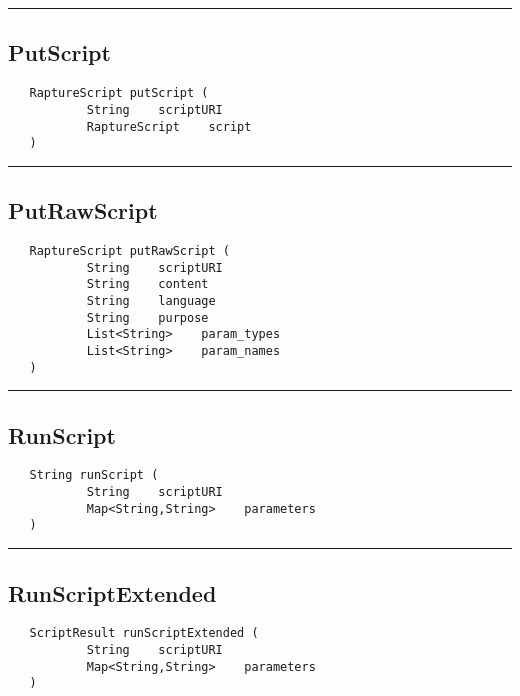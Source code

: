 \rule{15cm}{2pt}
\subsection{PutScript}
\label{Api:PutScript}
\begin{verbatim}
   RaptureScript putScript (
           String    scriptURI
           RaptureScript    script
   )
\end{verbatim}



\rule{15cm}{2pt}
\subsection{PutRawScript}
\label{Api:PutRawScript}
\begin{verbatim}
   RaptureScript putRawScript (
           String    scriptURI
           String    content
           String    language
           String    purpose
           List<String>    param_types
           List<String>    param_names
   )
\end{verbatim}



\rule{15cm}{2pt}
\subsection{RunScript}
\label{Api:RunScript}
\begin{verbatim}
   String runScript (
           String    scriptURI
           Map<String,String>    parameters
   )
\end{verbatim}



\rule{15cm}{2pt}
\subsection{RunScriptExtended}
\label{Api:RunScriptExtended}
\begin{verbatim}
   ScriptResult runScriptExtended (
           String    scriptURI
           Map<String,String>    parameters
   )
\end{verbatim}



